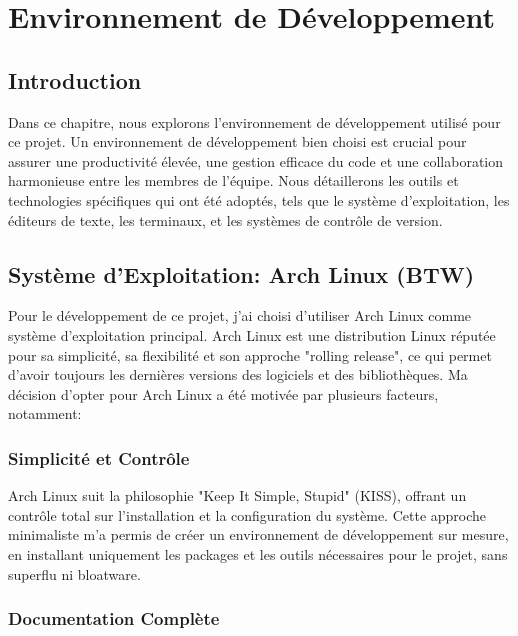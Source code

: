\chapter{Environnement de Développement}
\label{chap:Chapter 2 title}
\section*{Introduction}


\hspace{16pt}Dans ce chapitre, nous explorons l'environnement de développement utilisé pour ce projet. Un environnement de développement bien choisi est crucial pour assurer une productivité élevée, une gestion efficace du code et une collaboration harmonieuse entre les membres de l'équipe. Nous détaillerons les outils et technologies spécifiques qui ont été adoptés, tels que le système d'exploitation, les éditeurs de texte, les terminaux, et les systèmes de contrôle de version.


\pagebreak


\section{Système d'Exploitation: Arch Linux (BTW)}

\hspace{16pt}Pour le développement de ce projet, j'ai choisi d'utiliser Arch Linux comme système d'exploitation principal. Arch Linux est une distribution Linux réputée pour sa simplicité, sa flexibilité et son approche "rolling release", ce qui permet d'avoir toujours les dernières versions des logiciels et des bibliothèques. Ma décision d'opter pour Arch Linux a été motivée par plusieurs facteurs, notamment:

\subsection{Simplicité et Contrôle}

\hspace{16pt}Arch Linux suit la philosophie "Keep It Simple, Stupid" (KISS), offrant un contrôle total sur l'installation et la configuration du système. Cette approche minimaliste m'a permis de créer un environnement de développement sur mesure, en installant uniquement les packages et les outils nécessaires pour le projet, sans superflu ni bloatware.

\subsection{Documentation Complète}

